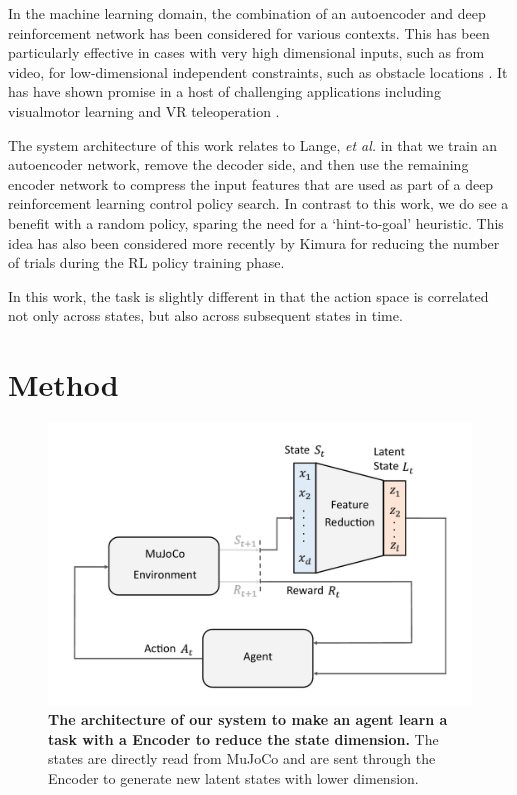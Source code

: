 \documentclass[letterpaper, 10 pt, conference]{ieeeconf}
\begin{document}
In the machine learning domain, the combination of an autoencoder and deep reinforcement network has been considered for various contexts. 
This has been particularly effective in cases with very high dimensional inputs, such as from video, for low-dimensional independent constraints, such as obstacle locations \cite{finn2016deep, bitzer2010using, lynch2019learning}.  
It has have shown promise in a host of challenging applications including visualmotor learning \cite{finn2016deep} and VR teleoperation \cite{zhang2018deep}. 

The system architecture of this work relates to Lange, \emph{et al.} \cite{lange2010deep} in that we train an autoencoder network, remove the decoder side, and then use the remaining encoder network to compress the input features that are used as part of a deep reinforcement learning control policy search.  In contrast to this work, we do see a benefit with a random policy, sparing the need for a `hint-to-goal' heuristic.  This idea has also been considered more recently by Kimura \cite{kimura2018daqn} for reducing the number of trials during the RL policy training phase.  

In this work, the task is slightly different in that the action space is correlated not only across states, but also across subsequent states in time.  





\section{Method}





\begin{figure}[t]
    \centering
    \includegraphics[width=\linewidth]{fig-system-arch}
    \caption{
        \textbf{The architecture of our system to make an agent learn a task with a Encoder to reduce the state dimension.} The states are directly read from MuJoCo and are sent through the Encoder to generate new latent states with lower dimension.
    }
    \label{fig:system-arch}
\end{figure}
\end{document}
